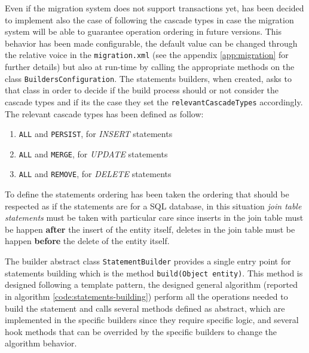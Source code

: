 \newparagraph Even if the migration system does not support transactions yet, has been decided to implement also the case of following the cascade types in case the migration system will be able to guarantee operation ordering in future versions.
This behavior has been made configurable, the default value can be changed through the relative voice in the \texttt{migration.xml} (see the appendix \ref{app:migration} for further details) but also at run-time by calling the appropriate methods on the class \texttt{BuildersConfiguration}. The statements builders, when created, asks to that class in order to decide if the build process should or not consider the cascade types and if its the case they set the \texttt{relevantCascadeTypes} accordingly.
The relevant cascade types has been defined as follow:
\begin{enumerate}
\item \texttt{ALL} and \texttt{PERSIST}, for \textit{INSERT} statements
\item \texttt{ALL} and \texttt{MERGE}, for \textit{UPDATE} statements
\item \texttt{ALL} and \texttt{REMOVE}, for \textit{DELETE} statements
\end{enumerate}
\noindent To define the statements ordering has been taken the ordering that should be respected as if the statements are for a SQL database, in this situation \textit{join table statements} must be taken with particular care since inserts in the join table must be happen \textbf{after} the insert of the entity itself, deletes in the join table must be happen \textbf{before} the delete of the entity itself.

\newparagraph The builder abstract class \texttt{StatementBuilder} provides a single entry point for statements building which is the method \texttt{build(Object entity)}. This method is designed following a template pattern, the designed general algorithm (reported in algorithm \ref{code:statements-building}) perform all the operations needed to   build the statement and calls several methods defined as abstract, which are implemented in the specific builders since they require specific logic, and several hook methods that can be overrided by the specific builders to change the algorithm behavior.

